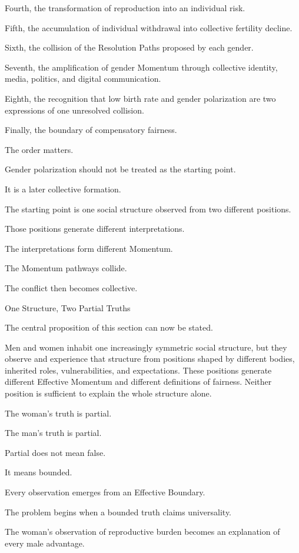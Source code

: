 Fourth, the transformation of reproduction into an individual risk.

Fifth, the accumulation of individual withdrawal into collective fertility decline.

Sixth, the collision of the Resolution Paths proposed by each gender.

Seventh, the amplification of gender Momentum through collective identity, media, politics, and digital communication.

Eighth, the recognition that low birth rate and gender polarization are two expressions of one unresolved collision.

Finally, the boundary of compensatory fairness.

The order matters.

Gender polarization should not be treated as the starting point.

It is a later collective formation.

The starting point is one social structure observed from two different positions.

Those positions generate different interpretations.

The interpretations form different Momentum.

The Momentum pathways collide.

The conflict then becomes collective.

One Structure, Two Partial Truths

The central proposition of this section can now be stated.

Men and women inhabit one increasingly symmetric social structure, but they observe and experience that structure from positions shaped by different bodies, inherited roles, vulnerabilities, and expectations. These positions generate different Effective Momentum and different definitions of fairness. Neither position is sufficient to explain the whole structure alone.

The woman’s truth is partial.

The man’s truth is partial.

Partial does not mean false.

It means bounded.

Every observation emerges from an Effective Boundary.

The problem begins when a bounded truth claims universality.

The woman’s observation of reproductive burden becomes an explanation of every male advantage.

